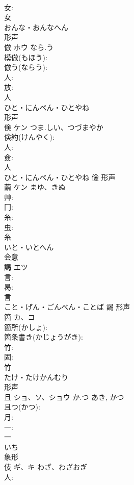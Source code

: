 \documentclass[8pt]{extreport}
\begin{document}
\begin{CJK}{UTF8}{min}
\\	女: 
\\	女	
\\	おんな・おんなへん	
\\	形声 
\\	倣	ホウ	なら.う		
\\	模倣(もほう): 
\\	倣う(ならう): 
\\	人: 
\\	放: 
\\	人	
\\	ひと・にんべん・ひとやね	
\\	形声 
\\	倹	ケン	つま.しい、つづまやか		
\\	倹約(けんやく): 
\\	人: 
\\	僉: 
\\	人	
\\	ひと・にんべん・ひとやね	儉	形声 
\\	繭	ケン	まゆ、きぬ		
\\	艸: 
\\	冂: 
\\	糸: 
\\	虫: 
\\	糸	
\\	いと・いとへん	
\\	会意 
\\	謁	エツ			
\\	言: 
\\	曷: 
\\	言	
\\	こと・げん・ごんべん・ことば	謁	形声 
\\	箇	カ、コ			
\\	箇所(かしょ): 
\\	箇条書き(かじょうがき): 
\\	竹: 
\\	固: 
\\	竹	
\\	たけ・たけかんむり	
\\	形声 
\\	且	ショ、ソ、ショウ	か.つ	あき, かつ	
\\	且つ(かつ): 
\\	月: 
\\	一: 
\\	一	
\\	いち	
\\	象形 
\\	伎	ギ、キ	わざ、わざおぎ		
\\	人: 

\end{CJK}
\end{document}

